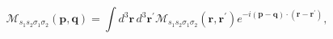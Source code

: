 \begin{equation}
\mathcal{M}_{s_{1}s_{2}\sigma _{1}\sigma _{2}}\left( \mathbf{p,q}\right)
=\int d^{3}\mathbf{r} \, d^{3}\mathbf{r}^{\prime }\mathcal{M}_{s_{1}s_{2}\sigma
_{1}\sigma _{2}}\left( \mathbf{r,r}^{\prime }\right) e^{-i\left( \mathbf{p-q}%
\right) \cdot \left( \mathbf{r-r}^{\prime }\right) },
\end{equation}

